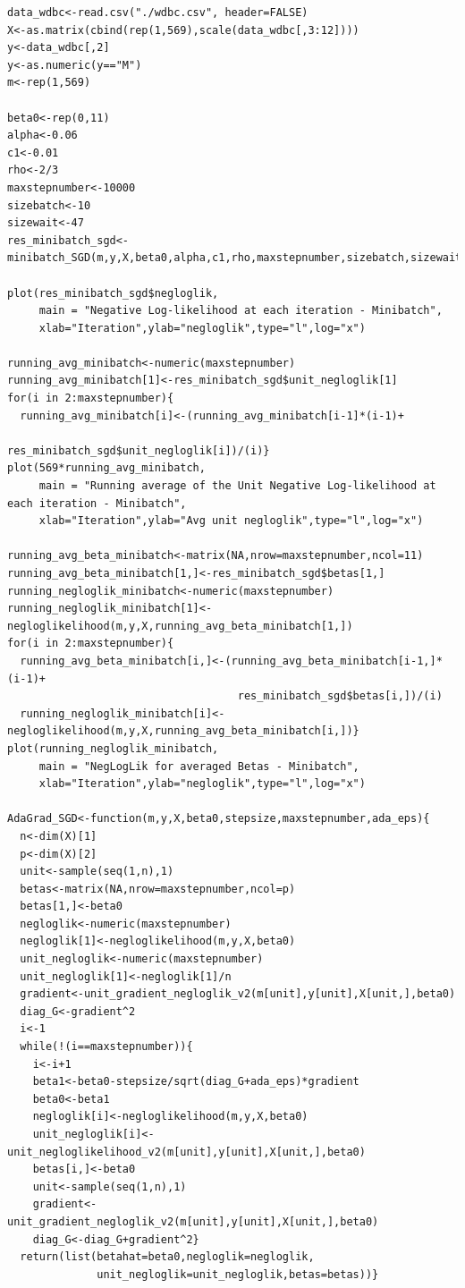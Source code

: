 \documentclass{article}
\begin{document}
\begin{lstlisting}
data_wdbc<-read.csv("./wdbc.csv", header=FALSE)
X<-as.matrix(cbind(rep(1,569),scale(data_wdbc[,3:12])))
y<-data_wdbc[,2]
y<-as.numeric(y=="M")
m<-rep(1,569)

beta0<-rep(0,11)
alpha<-0.06
c1<-0.01
rho<-2/3
maxstepnumber<-10000
sizebatch<-10
sizewait<-47
res_minibatch_sgd<-minibatch_SGD(m,y,X,beta0,alpha,c1,rho,maxstepnumber,sizebatch,sizewait)

plot(res_minibatch_sgd$negloglik,
     main = "Negative Log-likelihood at each iteration - Minibatch",
     xlab="Iteration",ylab="negloglik",type="l",log="x")

running_avg_minibatch<-numeric(maxstepnumber)
running_avg_minibatch[1]<-res_minibatch_sgd$unit_negloglik[1]
for(i in 2:maxstepnumber){
  running_avg_minibatch[i]<-(running_avg_minibatch[i-1]*(i-1)+
							  res_minibatch_sgd$unit_negloglik[i])/(i)}
plot(569*running_avg_minibatch,
     main = "Running average of the Unit Negative Log-likelihood at each iteration - Minibatch",
     xlab="Iteration",ylab="Avg unit negloglik",type="l",log="x")

running_avg_beta_minibatch<-matrix(NA,nrow=maxstepnumber,ncol=11)
running_avg_beta_minibatch[1,]<-res_minibatch_sgd$betas[1,]
running_negloglik_minibatch<-numeric(maxstepnumber)
running_negloglik_minibatch[1]<-negloglikelihood(m,y,X,running_avg_beta_minibatch[1,])
for(i in 2:maxstepnumber){
  running_avg_beta_minibatch[i,]<-(running_avg_beta_minibatch[i-1,]*(i-1)+
  									res_minibatch_sgd$betas[i,])/(i)
  running_negloglik_minibatch[i]<-negloglikelihood(m,y,X,running_avg_beta_minibatch[i,])}
plot(running_negloglik_minibatch,
     main = "NegLogLik for averaged Betas - Minibatch",
     xlab="Iteration",ylab="negloglik",type="l",log="x")

AdaGrad_SGD<-function(m,y,X,beta0,stepsize,maxstepnumber,ada_eps){
  n<-dim(X)[1]
  p<-dim(X)[2]
  unit<-sample(seq(1,n),1)
  betas<-matrix(NA,nrow=maxstepnumber,ncol=p)
  betas[1,]<-beta0
  negloglik<-numeric(maxstepnumber)
  negloglik[1]<-negloglikelihood(m,y,X,beta0)
  unit_negloglik<-numeric(maxstepnumber)
  unit_negloglik[1]<-negloglik[1]/n
  gradient<-unit_gradient_negloglik_v2(m[unit],y[unit],X[unit,],beta0)
  diag_G<-gradient^2
  i<-1
  while(!(i==maxstepnumber)){
    i<-i+1
    beta1<-beta0-stepsize/sqrt(diag_G+ada_eps)*gradient
    beta0<-beta1
    negloglik[i]<-negloglikelihood(m,y,X,beta0)
    unit_negloglik[i]<-unit_negloglikelihood_v2(m[unit],y[unit],X[unit,],beta0)
    betas[i,]<-beta0
    unit<-sample(seq(1,n),1)
    gradient<-unit_gradient_negloglik_v2(m[unit],y[unit],X[unit,],beta0)
    diag_G<-diag_G+gradient^2}
  return(list(betahat=beta0,negloglik=negloglik,
              unit_negloglik=unit_negloglik,betas=betas))}


\end{lstlisting}
\end{document}
